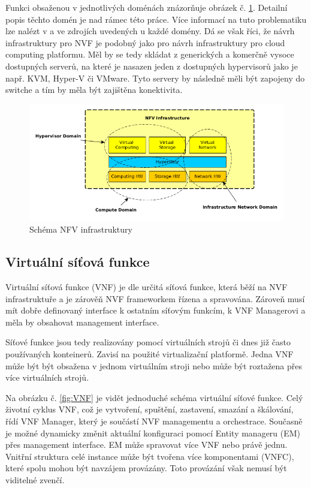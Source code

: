Funkci obsaženou v jednotlivých doménách znázorňuje obrázek č. \ref{fig:infrastruktura}. Detailní popis těchto domén je nad rámec této práce. Více informací na tuto problematiku lze nalézt v \cite{NFV_infrastructure} a ve zdrojích uvedených u každé domény. Dá se však říci, že návrh infrastruktury pro NVF je podobný jako pro návrh infrastruktury pro cloud computing platformu. Měl by se tedy skládat z generických a komerčně vysoce dostupných serverů, na které je nasazen jeden z dostupných hypervisorů jako je např. KVM, Hyper-V či VMware. Tyto servery by následně měli být zapojeny do switche a tím by měla být zajištěna konektivita. 

\begin{figure}[h]
\begin{centering}
\includegraphics[scale=0.65]{images/infrastruktura}
\par\end{centering}
\caption{Schéma NFV infrastruktury\label{fig:infrastruktura}}
\end{figure}

\subsection{Virtuální síťová funkce}

Virtuální síťová funkce (VNF) je dle \cite{NFV_VNF} určitá síťová funkce, která běží na NVF infrastruktuře a je zárověň NVF frameworkem řízena a spravována. Zároveň musí mít dobře definovaný interface k ostatním síťovým funkcím, k VNF Managerovi a měla by obsahovat management interface. 

Síťové funkce jsou tedy realizovány pomocí virtuálních strojů či dnes již často používaných konteinerů. Zavisí na použité virtualizační platformě. Jedna VNF může být být obsažena v jednom virtuálním stroji nebo může být roztažena přes více virtuálních strojů. 

Na obrázku č. \ref{fig:VNF} je vidět jednoduché schéma virtuální síťové funkce. Celý životní cyklus VNF, což je vytvoření, spuštění, zastavení, smazání a škálování, řídí VNF Manager, který je součástí NVF managementu a orchestrace. Současně je možné dynamicky změnit aktuální konfiguraci pomocí Entity manageru (EM) přes management interface. EM může spravovat více VNF nebo právě jednu. Vnitřní struktura celé instance může být tvořena více komponentami (VNFC), které spolu mohou být navzájem provázány. Toto provázání však nemusí být viditelné zvenčí.

